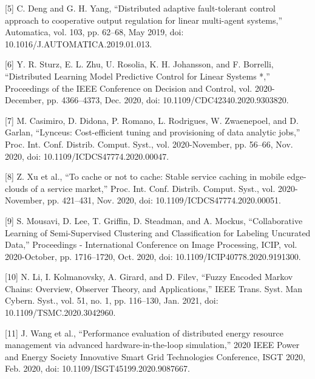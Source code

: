 \documentclass[12pt,a4paper]{article}
\begin{document}
\vspace{0.2cm}

[5]	C. Deng and G. H. Yang, “Distributed adaptive fault-tolerant control approach to cooperative output regulation for linear multi-agent systems,” Automatica, vol. 103, pp. 62–68, May 2019, doi: 10.1016/J.AUTOMATICA.2019.01.013.

\vspace{0.2cm}

[6]	Y. R. Sturz, E. L. Zhu, U. Rosolia, K. H. Johansson, and F. Borrelli, “Distributed Learning Model Predictive Control for Linear Systems *,” Proceedings of the IEEE Conference on Decision and Control, vol. 2020-December, pp. 4366–4373, Dec. 2020, doi: 10.1109/CDC42340.2020.9303820.

\vspace{0.2cm}

[7]	M. Casimiro, D. Didona, P. Romano, L. Rodrigues, W. Zwaenepoel, and D. Garlan, “Lynceus: Cost-efficient tuning and provisioning of data analytic jobs,” Proc. Int. Conf. Distrib. Comput. Syst., vol. 2020-November, pp. 56–66, Nov. 2020, doi: 10.1109/ICDCS47774.2020.00047.

\vspace{0.2cm}

[8]	Z. Xu et al., “To cache or not to cache: Stable service caching in mobile edge-clouds of a service market,” Proc. Int. Conf. Distrib. Comput. Syst., vol. 2020-November, pp. 421–431, Nov. 2020, doi: 10.1109/ICDCS47774.2020.00051.

\vspace{0.2cm}

[9]	S. Mousavi, D. Lee, T. Griffin, D. Steadman, and A. Mockus, “Collaborative Learning of Semi-Supervised Clustering and Classification for Labeling Uncurated Data,” Proceedings - International Conference on Image Processing, ICIP, vol. 2020-October, pp. 1716–1720, Oct. 2020, doi: 10.1109/ICIP40778.2020.9191300.

\vspace{0.2cm}

[10]	N. Li, I. Kolmanovsky, A. Girard, and D. Filev, “Fuzzy Encoded Markov Chains: Overview, Observer Theory, and Applications,” IEEE Trans. Syst. Man Cybern. Syst., vol. 51, no. 1, pp. 116–130, Jan. 2021, doi: 10.1109/TSMC.2020.3042960.

\vspace{0.2cm}

[11]	J. Wang et al., “Performance evaluation of distributed energy resource management via advanced hardware-in-the-loop simulation,” 2020 IEEE Power and Energy Society Innovative Smart Grid Technologies Conference, ISGT 2020, Feb. 2020, doi: 10.1109/ISGT45199.2020.9087667.
\end{document}
